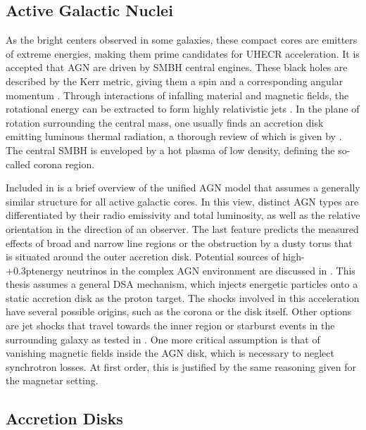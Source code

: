 \subsection{Active Galactic Nuclei}
\label{sub:nuclei}

As the bright centers observed in some galaxies, these compact cores are emitters of extreme energies, making them prime
candidates for UHECR acceleration. It is accepted that AGN are driven by SMBH central engines. These black holes are described
by the Kerr metric, giving them a spin and a corresponding angular momentum \cite{Visser_2008}. Through interactions of
infalling material and magnetic fields, the rotational energy can be extracted to form highly relativistic jets \cite{Blandford_2019}.
In the plane of rotation surrounding the central mass, one usually finds an accretion disk emitting luminous thermal radiation,
a thorough review of which is given by \cite{Abramowicz_2013}. The central SMBH is enveloped by a hot plasma of low density,
defining the so-called corona region.

\newpage

Included in \cite{Beckmann_2013} is a brief overview of the unified AGN model that assumes a generally similar structure for all active
galactic cores. In this view, distinct AGN types are differentiated
by their radio emissivity and total luminosity, as well as the relative orientation in the direction of an observer. The
last feature predicts the measured effects of broad and narrow line regions or the obstruction by a dusty torus that is situated
around the outer accretion disk. Potential sources of high-{\kern+0.3pt}energy neutrinos in the complex AGN environment are discussed
in \cite{Murase_2023}. This thesis assumes a general DSA mechanism, which injects energetic particles onto a static accretion disk as
the proton target. The shocks involved in this acceleration have several possible origins, such as the corona or the disk itself. Other
options are jet shocks that travel towards the inner region or starburst events in the surrounding galaxy as tested in \cite{Eichmann_2022}.
One more critical assumption is that of vanishing magnetic fields inside the AGN disk, which is necessary to neglect synchrotron losses.
At first order, this is justified by the same reasoning given for the magnetar setting.



\subsection{Accretion Disks}
\label{sub:accretion}

